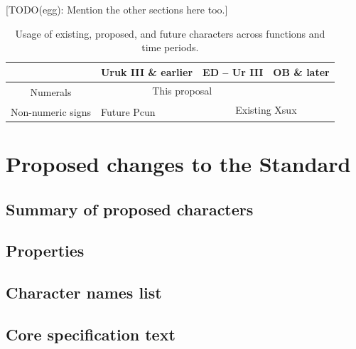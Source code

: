\documentclass[10pt, a4paper, twoside]{article}
\begin{document}
[TODO(egg): Mention the other sections here too.]

\begin{table}[htbp]
\begin{center}
\begin{tabular}{ l | l | l | l |} \cline{2-4}
                                                & Uruk III \& earlier & ED – Ur III                         & OB \& later    \\\hline
\multicolumn{1}{|c|}{\multirow{2}{*}{Numerals}} & \multicolumn{2}{|c|}{This proposal}                       &                \\\cline{2-4}
\multicolumn{1}{|c|}{}                          &                     & \multicolumn{2}{|c|}{\multirow{2}{*}{Existing Xsux}} \\\cline{1-2}
\multicolumn{1}{|c|}{Non-numeric signs}         & Future Pcun         & \multicolumn{2}{|c|}{}                               \\\hline
\end{tabular}
\caption{Usage of existing, proposed, and future characters across functions and time periods.}
\end{center}
\label{tableUnificationsDisunifications}
\end{table}

\section{Proposed changes to the Standard}
\label{proposal}
\subsection{Summary of proposed characters}
\subsection{Properties}
\label{properties}
\subsection{Character names list}
\subsection{Core specification text}
\end{document}
